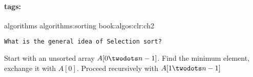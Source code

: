 \documentclass[12pt]{article}
\newcommand*{\tags}[1]{\paragraph{tags: }#1\bigskip}
\newenvironment{field}{}{}
\newcommand*{\xplain}[1]{\begin{mdframed}\texttt{#1}\end{mdframed}\bigskip}
\newenvironment{note}{}{}
\begin{document}
\tags{algorithms algorithms:sorting book:algos:clr:ch2}
\begin{note}
    \xplain{What is the general idea of Selection sort?}
    \begin{field}
        Start with an unsorted array $A[0 \twodots n-1]$.
        Find the minimum element, exchange it with $A[0]$.
        Proceed recursively with $A[1 \twodots n-1]$
    \end{field}
\end{note}
\end{document}
